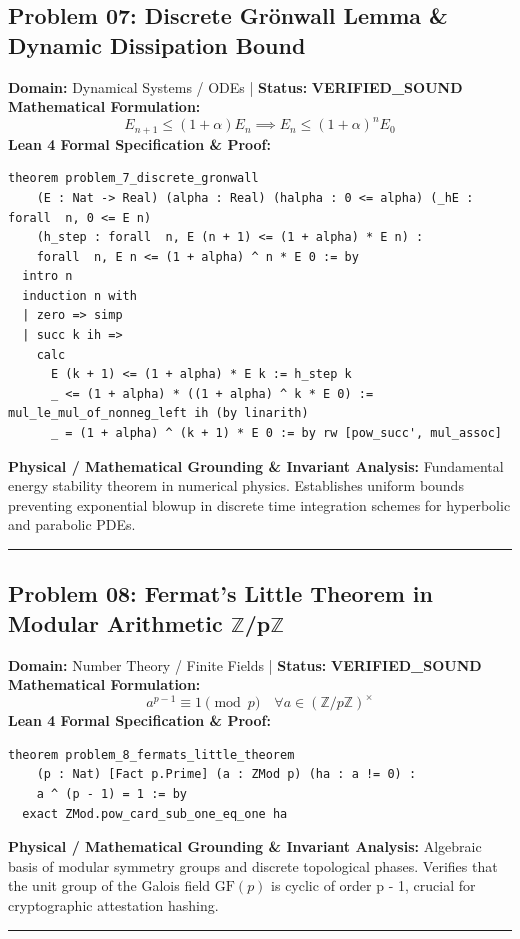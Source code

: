 \documentclass[10pt,a4paper]{article}
\begin{document}
\subsection*{Problem 07: Discrete Grönwall Lemma \& Dynamic Dissipation Bound}
\textbf{Domain:} Dynamical Systems / ODEs \quad | \quad \textbf{Status:} \textcolor{green!70!black}{\textbf{VERIFIED\_SOUND}}\\
\textbf{Mathematical Formulation:}
\begin{equation*}
  E_{n+1} \le (1 + \alpha) E_n \implies E_n \le (1 + \alpha)^n E_0
\end{equation*}
\textbf{Lean 4 Formal Specification \& Proof:}
\begin{lstlisting}
theorem problem_7_discrete_gronwall
    (E : Nat -> Real) (alpha : Real) (halpha : 0 <= alpha) (_hE : forall  n, 0 <= E n)
    (h_step : forall  n, E (n + 1) <= (1 + alpha) * E n) :
    forall  n, E n <= (1 + alpha) ^ n * E 0 := by
  intro n
  induction n with
  | zero => simp
  | succ k ih =>
    calc
      E (k + 1) <= (1 + alpha) * E k := h_step k
      _ <= (1 + alpha) * ((1 + alpha) ^ k * E 0) := mul_le_mul_of_nonneg_left ih (by linarith)
      _ = (1 + alpha) ^ (k + 1) * E 0 := by rw [pow_succ', mul_assoc]
\end{lstlisting}
\textbf{Physical / Mathematical Grounding \& Invariant Analysis:}
Fundamental energy stability theorem in numerical physics. Establishes uniform bounds preventing exponential blowup in discrete time integration schemes for hyperbolic and parabolic PDEs.
\vspace{0.8em}\hrule\vspace{0.8em}
\subsection*{Problem 08: Fermat's Little Theorem in Modular Arithmetic $\mathbb{Z}$/p$\mathbb{Z}$}
\textbf{Domain:} Number Theory / Finite Fields \quad | \quad \textbf{Status:} \textcolor{green!70!black}{\textbf{VERIFIED\_SOUND}}\\
\textbf{Mathematical Formulation:}
\begin{equation*}
  a^{p-1} \equiv 1 \pmod p \quad \forall a \in (\mathbb{Z}/p\mathbb{Z})^\times
\end{equation*}
\textbf{Lean 4 Formal Specification \& Proof:}
\begin{lstlisting}
theorem problem_8_fermats_little_theorem
    (p : Nat) [Fact p.Prime] (a : ZMod p) (ha : a != 0) :
    a ^ (p - 1) = 1 := by
  exact ZMod.pow_card_sub_one_eq_one ha
\end{lstlisting}
\textbf{Physical / Mathematical Grounding \& Invariant Analysis:}
Algebraic basis of modular symmetry groups and discrete topological phases. Verifies that the unit group of the Galois field $\mathrm{GF}(p)$ is cyclic of order p - 1, crucial for cryptographic attestation hashing.
\vspace{0.8em}\hrule\vspace{0.8em}
\end{document}

